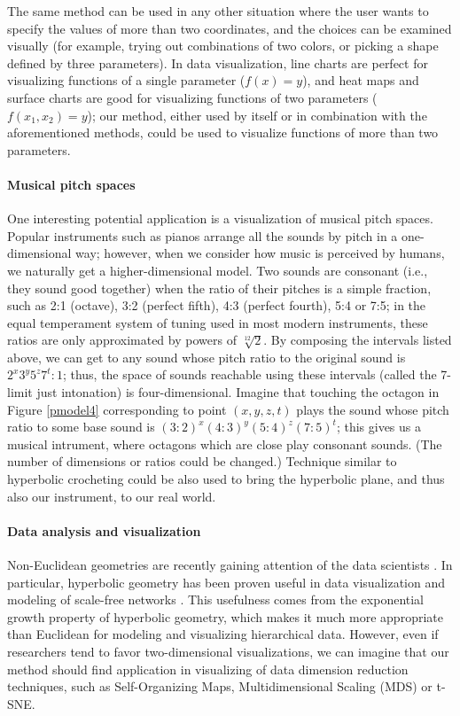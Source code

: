 \documentclass{article}
\begin{document}
The same method can be used in any other situation where the user wants to specify the values of more than two coordinates, and the choices
can be examined visually (for example, trying out combinations of two colors, or picking a shape defined by three parameters). In data
visualization, line charts are perfect for visualizing functions of a single parameter ($f(x)=y$), and heat maps and surface charts
are good for visualizing functions of two parameters ($f(x_1,x_2)=y$); our method, either used by itself or in combination with the
aforementioned methods, could be used to visualize functions of more than two parameters.

\paragraph{Musical pitch spaces} One interesting potential application is a visualization of musical pitch spaces. Popular instruments
such as pianos arrange all the sounds by pitch in a one-dimensional way; however, when we consider how music is perceived by humans,
we naturally get a higher-dimensional model. Two sounds are consonant (i.e., they sound good together) when the ratio of their pitches is a simple fraction, such as
2:1 (octave), 3:2 (perfect fifth), 4:3 (perfect fourth), 5:4 or 7:5; in the equal temperament system of tuning used in most modern instruments,
these ratios are only approximated by powers of $\sqrt[12]{2}$. By composing the intervals listed above, we can get to any sound whose pitch ratio
to the original sound is $2^x 3^y 5^z 7^t:1$; thus, the space of sounds reachable using these intervals (called the 7-limit just intonation)
is four-dimensional.
Imagine that touching the octagon in Figure \ref{pmodel4} corresponding to point $(x,y,z,t)$ plays the sound whose pitch ratio to some base
sound is $(3:2)^x(4:3)^y(5:4)^z(7:5)^t$; this gives us a musical intrument, where octagons which are close play consonant sounds.
(The number of dimensions or ratios could be changed.) Technique similar to hyperbolic crocheting \cite{taimina} could be also used to bring
the hyperbolic plane, and thus also our instrument, to our real world.


\paragraph{Data analysis and visualization} Non-Euclidean geometries are recently gaining attention of the data scientists \cite{tda,tda_chazal}.
In particular, hyperbolic geometry has been proven useful in data visualization and modeling of scale-free networks \cite{hypgeo,papa}.
This usefulness comes from the exponential growth property of hyperbolic geometry, which makes it much more appropriate than Euclidean for modeling and visualizing hierarchical data. However, even if researchers tend to favor two-dimensional visualizations, we can imagine that our method should find application in visualizing of data dimension reduction techniques, such as Self-Organizing Maps, Multidimensional Scaling (MDS) or t-SNE. 
\end{document}

